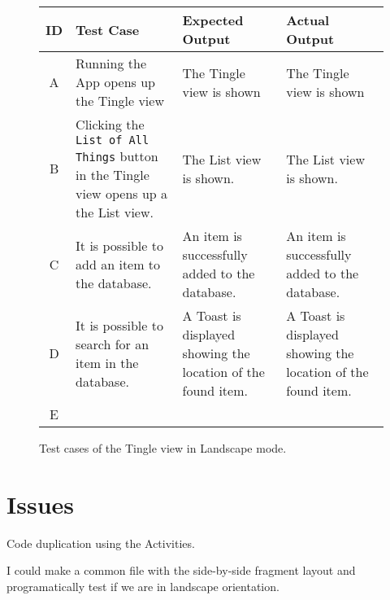 \begin{figure}[H]
	\renewcommand*{\arraystretch}{1.5} %
	\begin{tabular}{| c | p{3.5cm} | p{3.5cm} | p{3.5cm} |}
		\hline
		{\textbf{ID} } & {\textbf{Test Case} } & {\textbf{Expected Output}} & {\textbf {Actual Output}} \\\hline\hline
		A & Running the App opens up the Tingle view & The Tingle view is shown & The Tingle view is shown  \\ \hline
		B &	Clicking the \texttt{List of All Things} button in the Tingle view opens up a the List view. & The List view is shown. & The List view is shown. \\ \hline
		C & It is possible to add an item to the database. & An item is successfully added to the database. & An item is successfully added to the database. \\ \hline
		D & It is possible to search for an item in the database. & A Toast is displayed showing the location of the found item. & A Toast is displayed showing the location of the found item. \\ \hline
		E & & & \\ \hline
	\end{tabular}
	
	\caption{Test cases of the Tingle view in Landscape mode.}
	\label{tab:test-cases-tingle-landscape}
\end{figure}


\section{Issues}


Code duplication using the Activities.

I could make a common file with the side-by-side fragment layout and programatically test
if we are in landscape orientation.
